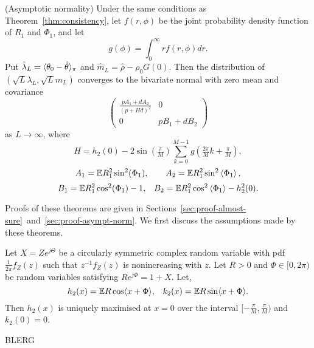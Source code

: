 \documentclass[journal]{IEEEtran}
\begin{document}
\begin{theorem}\label{thm:normality} (Asymptotic normality)
Under the same conditions as Theorem~\ref{thm:consistency}, let $f(r,\phi)$ be the joint probability density function of $R_1$ and $\Phi_1$, and let
\[
g(\phi) = \int_{0}^{\infty} r f(r,\phi) dr.
\]
Put $\hat{\lambda}_L = \langle \theta_0 - \hat{\theta} \rangle_\pi$ and $\hat{m}_L = \hat{\rho} - \rho_0 G(0)$. %
Then the distribution of $(\sqrt{L}\lambda_L, \sqrt{L}m_L)$ converges to the bivariate normal with zero mean and covariance
\[
\left( \begin{array}{cc} 
\frac{pA_1 + dA_2}{(p + H d)^2} & 0 \\
0 & pB_1 + dB_2
\end{array} \right)
\]
as $L \rightarrow \infty$, where
\[
H = h_2(0) -  2 \sin(\tfrac{\pi}{M}) \sum_{k = 0}^{M-1} g(\tfrac{2\pi}{M}k + \tfrac{\pi}{M}),
\]
\[
A_1 = {\mathbb E} R_1^2\sin^2(\Phi_1), \qquad A_2 = {\mathbb E} R_1^2\sin^2\left\langle \Phi_1 \right\rangle,
\]
\[
B_1 = {\mathbb E} R_1^2 \cos^2(\Phi_1) - 1, \;\;\; B_2 = {\mathbb E} R_1^2 \cos^2\left\langle \Phi_1 \right\rangle - h_2^2(0).
\]
\end{theorem}



Proofs of these theorems are given in Sections~\ref{sec:proof-almost-sure}~and~\ref{sec:proof-asympt-norm}.  We first discuss the assumptions made by these theorems. 

\begin{lemma}
Let $X = Z e^{j\Theta}$ be a circularly symmetric complex random variable with pdf $\tfrac{1}{2\pi}f_Z(z)$ such that $z^{-1} f_Z(z)$ is nonincreasing with $z$.  Let $R > 0$ and $\Phi \in [0, 2\pi)$ be random variables satisfying $R e^{j\Phi} = 1 + X$.  Let,
\[
h_2(x) = {\mathbb E} R \cos\langle x + \Phi \rangle, \;\;\; k_2(x) =  {\mathbb E} R \sin\langle  x + \Phi \rangle.
\]
Then $h_2(x)$ is uniquely maximised at $x=0$ over the interval $[-\tfrac{\pi}{M},\tfrac{\pi}{M})$ and $k_2(0) = 0$.
\end{lemma}
\begin{IEEEproof}
BLERG
\end{IEEEproof}
\end{document}
